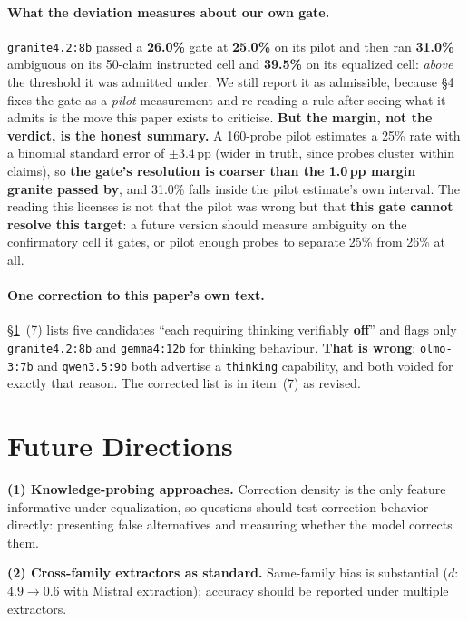 \paragraph{What the deviation measures about our own gate.} \texttt{granite4.2:8b} passed a \textbf{26.0\%} gate at \textbf{25.0\%} on its pilot and then ran \textbf{31.0\%} ambiguous on its 50-claim instructed cell and \textbf{39.5\%} on its equalized cell: \emph{above} the threshold it was admitted under. We still report it as admissible, because §4 fixes the gate as a \emph{pilot} measurement and re-reading a rule after seeing what it admits is the move this paper exists to criticise. \textbf{But the margin, not the verdict, is the honest summary.} A 160-probe pilot estimates a 25\% rate with a binomial standard error of $\pm3.4$\,pp (wider in truth, since probes cluster within claims), so \textbf{the gate's resolution is coarser than the 1.0\,pp margin granite passed by}, and 31.0\% falls inside the pilot estimate's own interval. The reading this licenses is not that the pilot was wrong but that \textbf{this gate cannot resolve this target}: a future version should measure ambiguity on the confirmatory cell it gates, or pilot enough probes to separate 25\% from 26\% at all.

\paragraph{One correction to this paper's own text.} §\ref{app:future_directions}~(7) lists five candidates ``each requiring thinking verifiably \textbf{off}'' and flags only \texttt{granite4.2:8b} and \texttt{gemma4:12b} for thinking behaviour. \textbf{That is wrong}: \texttt{olmo-3:7b} and \texttt{qwen3.5:9b} both advertise a \texttt{thinking} capability, and both voided for exactly that reason. The corrected list is in item~(7) as revised.

\section{Future Directions}\label{app:future_directions}

\textbf{(1) Knowledge-probing approaches.} Correction density is the only feature informative under equalization, so questions should test correction behavior directly: presenting false alternatives and measuring whether the model corrects them.

\textbf{(2) Cross-family extractors as standard.} Same-family bias is substantial ($d$: $4.9 \to 0.6$ with Mistral extraction); accuracy should be reported under multiple extractors.

